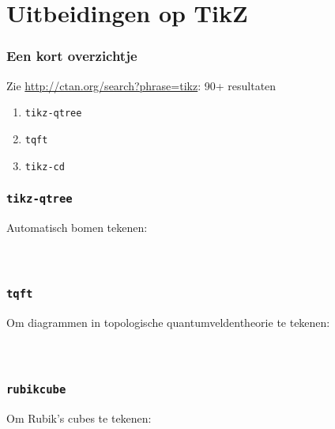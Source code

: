 \section{Uitbeidingen op TikZ}

\begin{frame}
  \frametitle{Een kort overzichtje}

  Zie \url{http://ctan.org/search?phrase=tikz}: 90+ resultaten

  \begin{enumerate}
    \item \texttt{tikz-qtree}
    \item \texttt{tqft}
    \item \texttt{tikz-cd}
  \end{enumerate}
\end{frame}

\begin{frame}
  \frametitle{\texttt{tikz-qtree}}
  
  Automatisch bomen tekenen:
  \begin{columns}
    \begin{column}{.6\textwidth}
      \inputminted[fontsize = \scriptsize]{latex}{tikz/tikz-qtree.tikz}
    \end{column}
    \begin{column}{.4\textwidth}
      
    \end{column}
  \end{columns}
\end{frame}

\begin{frame}
  \frametitle{\texttt{tqft}}
  
  Om diagrammen in topologische quantumveldentheorie te tekenen:
  \begin{columns}
    \begin{column}{.6\textwidth}
      \inputminted[fontsize = \scriptsize]{latex}{tikz/tqft.tikz}
    \end{column}
    \begin{column}{.4\textwidth}
      
    \end{column}
  \end{columns}
\end{frame}

\begin{frame}
  \frametitle{\texttt{rubikcube}}

  Om Rubik's cubes te tekenen:
  \begin{columns}
    \begin{column}{.6\textwidth}
      \inputminted[fontsize = \scriptsize]{latex}{tikz/rubikcube.tikz}
    \end{column}
    \begin{column}{.4\textwidth}
      
    \end{column}
  \end{columns}
\end{frame}

